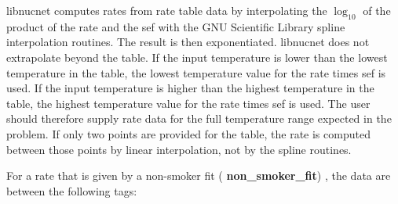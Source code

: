 \documentclass{article}    %
\begin{document}
libnucnet computes rates from rate table data by interpolating the
$\log_{10}$ of the product of the rate and the sef with the GNU
Scientific Library spline interpolation routines.  The result is
then exponentiated.  libnucnet does not extrapolate beyond the
table.  If the input temperature is lower than the lowest
temperature in the table, the lowest temperature value for the rate
times sef is used.  If the input temperature is higher than the
highest temperature in the table, the highest temperature value for
the rate times sef is used.  The user should therefore supply rate
data for the full temperature range expected in the problem.
If only two points are provided for the table, the rate is computed between
those points by linear interpolation, not by the spline routines.

For a rate that is given by a non-smoker fit ({\bf
non\_smoker\_fit}) \cite{2000ADNDT..75....1R},
the data are between the following tags:
\end{document}
